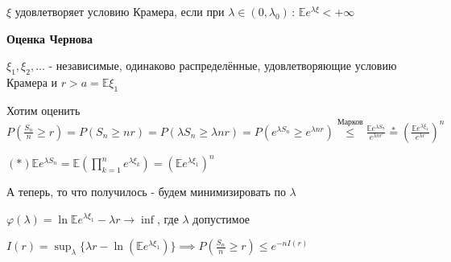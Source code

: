  \begin{definition}
    $\xi$ удовлетворяет условию Крамера, если при $\lambda \in (0, \lambda_0)\, : \, \mathbb{E} e^{\lambda \xi} < +\infty$
 \end{definition}

 \begin{theorem}

    \textbf{Оценка Чернова}

    $\xi_1, \xi_2, \ldots$ - независимые, одинаково распределённые, удовлетворяющие условию Крамера и $r > a = \mathbb{E}\xi_1$

    Хотим оценить $P\left( \frac{S_n}{n} \geqslant r \right) = P\left( S_n \geqslant nr \right) = P\left( \lambda S_n \geqslant \lambda nr \right) = P\left( e^{ \lambda S_n} \geqslant e^{\lambda nr} \right) \overset{\text{Марков}}{\leqslant} \frac{\mathbb{E} e^{\lambda S_n}}{e^{\lambda n r}}
    \overset{*}{=} \left( \frac{\mathbb{E} e^{\lambda \xi_1}}{e^{\lambda r}}  \right)^n$

    $(*) \mathbb{E} e^{\lambda S_n} = \mathbb{E} (\prod_{k = 1}^n e^{\lambda \xi_k}) = (\mathbb{E} e^{\lambda \xi_1})^n$

    А теперь, то что получилось - будем минимизировать по $\lambda$

    $\varphi (\lambda) = \ln \mathbb{E} e^{\lambda \xi_1} - \lambda r \rightarrow \inf$, где $\lambda$ допустимое

    $I(r) = \sup_{\lambda} \{ \lambda r - \ln (\mathbb{E} e^{\lambda \xi_1}) \} \implies P \left( \frac{S_n}{n} \geqslant r \right) \leqslant e^{-n I(r)}$
 \end{theorem}

